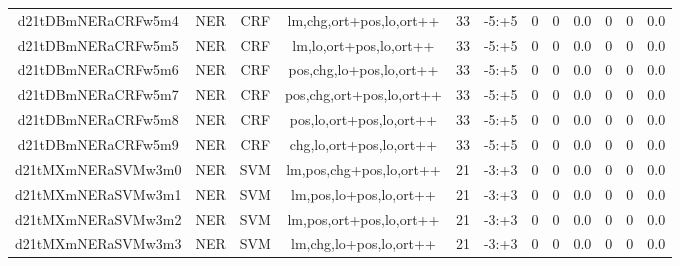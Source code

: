 \documentclass[a4paper]{article}
\begin{document}
\begin{landscape}
\begin{center}
\begin{tabular}{ |c|c|c|c|c|c|c|c|c|c|c|c|}
 
 	
 	\small{ d21tDBmNERaCRFw5m4 } & \small{ NER} & \small{  CRF }  & lm,chg,ort+pos,lo,ort++  &  33 &  \small{  -5:+5 }  &  0 & 0 & 0.0  &  0 & 0 & 0.0 \\
 	

 
 	
 	\small{ d21tDBmNERaCRFw5m5 } & \small{ NER} & \small{  CRF }  & lm,lo,ort+pos,lo,ort++  &  33 &  \small{  -5:+5 }  &  0 & 0 & 0.0  &  0 & 0 & 0.0 \\
 	

 
 	
 	\small{ d21tDBmNERaCRFw5m6 } & \small{ NER} & \small{  CRF }  & pos,chg,lo+pos,lo,ort++  &  33 &  \small{  -5:+5 }  &  0 & 0 & 0.0  &  0 & 0 & 0.0 \\
 	

 
 	
 	\small{ d21tDBmNERaCRFw5m7 } & \small{ NER} & \small{  CRF }  & pos,chg,ort+pos,lo,ort++  &  33 &  \small{  -5:+5 }  &  0 & 0 & 0.0  &  0 & 0 & 0.0 \\
 	

 
 	
 	\small{ d21tDBmNERaCRFw5m8 } & \small{ NER} & \small{  CRF }  & pos,lo,ort+pos,lo,ort++  &  33 &  \small{  -5:+5 }  &  0 & 0 & 0.0  &  0 & 0 & 0.0 \\
 	

 
 	
 	\small{ d21tDBmNERaCRFw5m9 } & \small{ NER} & \small{  CRF }  & chg,lo,ort+pos,lo,ort++  &  33 &  \small{  -5:+5 }  &  0 & 0 & 0.0  &  0 & 0 & 0.0 \\
 	

 
 	
 	\small{ d21tMXmNERaSVMw3m0 } & \small{ NER} & \small{  SVM }  & lm,pos,chg+pos,lo,ort++  &  21 &  \small{  -3:+3 }  &  0 & 0 & 0.0  &  0 & 0 & 0.0 \\
 	

 
 	
 	\small{ d21tMXmNERaSVMw3m1 } & \small{ NER} & \small{  SVM }  & lm,pos,lo+pos,lo,ort++  &  21 &  \small{  -3:+3 }  &  0 & 0 & 0.0  &  0 & 0 & 0.0 \\
 	

 
 	
 	\small{ d21tMXmNERaSVMw3m2 } & \small{ NER} & \small{  SVM }  & lm,pos,ort+pos,lo,ort++  &  21 &  \small{  -3:+3 }  &  0 & 0 & 0.0  &  0 & 0 & 0.0 \\
 	

 
 	
 	\small{ d21tMXmNERaSVMw3m3 } & \small{ NER} & \small{  SVM }  & lm,chg,lo+pos,lo,ort++  &  21 &  \small{  -3:+3 }  &  0 & 0 & 0.0  &  0 & 0 & 0.0 \\
 	


\end{tabular}
\end{center}
\end{landscape}
\end{document}
